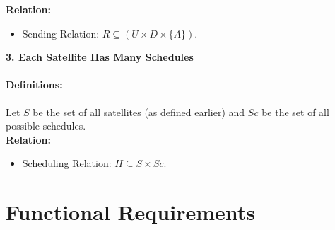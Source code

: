 \documentclass[12pt]{article}
\begin{document}
\textbf{Relation:}
\begin{itemize}
  \item Sending Relation: $R \subseteq (U \times D \times \{A\})$.
\end{itemize}

\textbf{3. Each Satellite Has Many Schedules}

\paragraph{Definitions:}
Let $S$ be the set of all satellites (as defined earlier) and $Sc$ be the set of all possible schedules.\\

\textbf{Relation:}
\begin{itemize}
  \item Scheduling Relation: $H \subseteq S \times Sc$.
\end{itemize}



\section{Functional Requirements}
\end{document}
